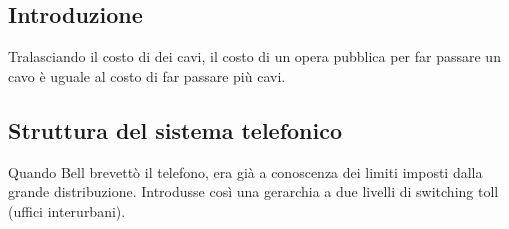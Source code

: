 \documentclass[../main.tex]{subfiles}
\begin{document}
\subsection{Introduzione}

Tralasciando il costo di dei cavi, il costo di un opera pubblica per far passare un cavo è uguale al costo di far passare più cavi.

\subsection{Struttura del sistema telefonico}

Quando Bell brevettò il telefono, era già a conoscenza dei limiti imposti dalla grande distribuzione.
Introdusse così una gerarchia a due livelli di switching toll (uffici interurbani).
\end{document}
